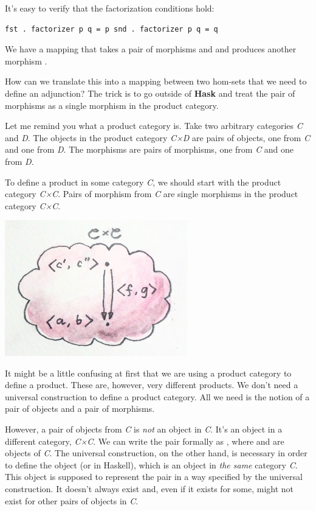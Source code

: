 It's easy to verify that the factorization conditions hold:

\begin{verbatim}
fst . factorizer p q = p snd . factorizer p q = q
\end{verbatim}

We have a mapping that takes a pair of morphisms  and
 and produces another morphism
.

How can we translate this into a mapping between two hom-sets that we
need to define an adjunction? The trick is to go outside of
\textbf{Hask} and treat the pair of morphisms as a single morphism in
the product category.

Let me remind you what a product category is. Take two arbitrary
categories \emph{C} and \emph{D}. The objects in the product category
\emph{C×D} are pairs of objects, one from \emph{C} and one from
\emph{D}. The morphisms are pairs of morphisms, one from \emph{C} and
one from \emph{D}.

To define a product in some category \emph{C}, we should start with the
product category \emph{C×C}. Pairs of morphism from \emph{C} are single
morphisms in the product category \emph{C×C}.

\includegraphics[width=3.12500in]{images/adj-productcat.jpg}

It might be a little confusing at first that we are using a product
category to define a product. These are, however, very different
products. We don't need a universal construction to define a product
category. All we need is the notion of a pair of objects and a pair of
morphisms.

However, a pair of objects from \emph{C} is \emph{not} an object in
\emph{C}. It's an object in a different category, \emph{C×C}. We can
write the pair formally as ,
where  and  are objects of \emph{C}. The universal
construction, on the other hand, is necessary in order to define the
object  (or  in Haskell), which is an object
in \emph{the same} category \emph{C}. This object is supposed to
represent the pair  in a way
specified by the universal construction. It doesn't always exist and,
even if it exists for some, might not exist for other pairs of objects
in \emph{C}.

